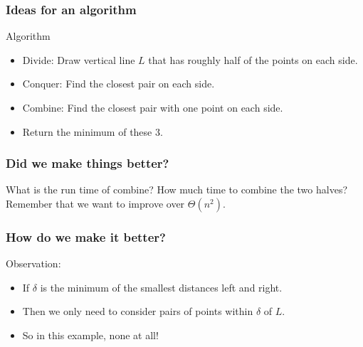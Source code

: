\begin{frame}
	\frametitle{Ideas for an algorithm}

	\begin{overlayarea}{\textwidth}{\textheight}
		
		
		\pause
		\begin{exampleblock}{Algorithm}
			\begin{itemize}
				\item \alert<2>{Divide}: Draw vertical line $L$ that has roughly half of the points on each side.
					\pause
				\item \alert<3>{Conquer}: Find the closest pair on each side.
					\pause
				\item \alert<4>{Combine}: Find the closest pair with one point on each side.
					\pause
				\item Return the minimum of these 3.
			\end{itemize}
		\end{exampleblock}	
	\end{overlayarea}
\end{frame}

\begin{frame}
	\frametitle{Did we make things better?}
	\begin{questionblock}{What is the run time of combine?}
		How much time to combine the two halves? Remember that we want to improve over $\Theta(n^2)$.
	\end{questionblock}	
\end{frame}

\begin{frame}
	\frametitle{How do we make it better?}
		
	Observation:
	\begin{itemize}
		\item If $\delta$ is the minimum of the smallest distances left and right.
			\pause
		\item Then we only need to consider pairs of points within $\delta$ of $L$.
			\pause
		\item So in this example, none at all!
	\end{itemize}
\end{frame}

